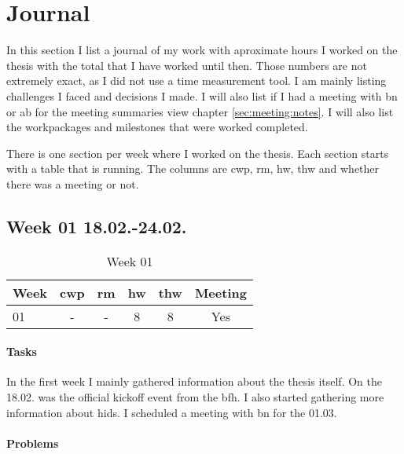 \chapter{Journal}
\label{sec:journal}

In this section I list a journal of my work with aproximate hours I worked on the thesis with the total that I have worked until then. Those numbers are not extremely exact, as I did not use a time measurement tool. I am mainly listing challenges I faced and decisions I made. I will also list if I had a meeting with \gls{bn} or \gls{ab} for the meeting summaries view chapter \ref{sec:meeting:notes}. I will also list the workpackages and milestones that were worked completed.

There is one section per week where I worked on the thesis. Each section starts with a table that is running. The columns are \gls{cwp}, \gls{rm}, \gls{hw}, \gls{thw} and whether there was a meeting or not.


\section{Week 01 18.02.-24.02.}
\label{sec:journal:week01}

\begin{table}[!ht]
    \begin{center}
        \caption{Week 01}
        \label{tab:journal:week01}
        \begin{tabular}{l|c|c|c|c|c}
            \textbf{Week} & \textbf{\gls{cwp}} & \textbf{\gls{rm}} & \textbf{\gls{hw}} & \textbf{\gls{thw}} & \textbf{Meeting}\\
        \hline
        01 & - & - & 8 & 8 & Yes \\
        \end{tabular}
    \end{center}
\end{table}

\subsubsection{Tasks}

In the first week I mainly gathered information about the thesis itself. On the 18.02. was the official kickoff event from the \gls{bfh}. I also started gathering more information about \gls{hids}. I scheduled a meeting with \gls{bn} for the 01.03.

\subsubsection{Problems}

